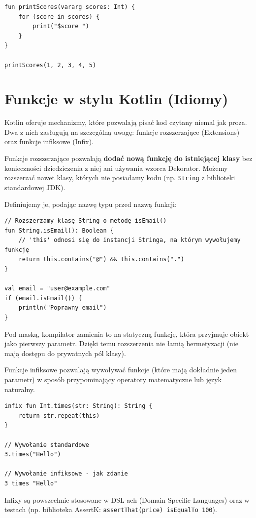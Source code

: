 \begin{verbatim}
fun printScores(vararg scores: Int) {
    for (score in scores) {
        print("$score ")
    }
}

printScores(1, 2, 3, 4, 5)
\end{verbatim}

\section{Funkcje w stylu Kotlin (Idiomy)}

Kotlin oferuje mechanizmy, które pozwalają pisać kod czytany niemal jak proza. Dwa z nich zasługują na szczególną uwagę: funkcje rozszerzające (Extensions) oraz funkcje infiksowe (Infix).

Funkcje rozszerzające pozwalają \textbf{dodać nową funkcję do istniejącej klasy} bez konieczności dziedziczenia z niej ani używania wzorca Dekorator. Możemy rozszerzać nawet klasy, których nie posiadamy kodu (np. \texttt{String} z biblioteki standardowej JDK).

Definiujemy je, podając nazwę typu przed nazwą funkcji:
\begin{verbatim}
// Rozszerzamy klasę String o metodę isEmail()
fun String.isEmail(): Boolean {
    // 'this' odnosi się do instancji Stringa, na którym wywołujemy funkcję
    return this.contains("@") && this.contains(".")
}

val email = "user@example.com"
if (email.isEmail()) { 
    println("Poprawny email")
}
\end{verbatim}

Pod maską, kompilator zamienia to na statyczną funkcję, która przyjmuje obiekt jako pierwszy parametr. Dzięki temu rozszerzenia nie łamią hermetyzacji (nie mają dostępu do prywatnych pól klasy).

Funkcje infiksowe pozwalają wywoływać funkcje (które mają dokładnie jeden parametr) w sposób przypominający operatory matematyczne lub język naturalny.

\begin{verbatim}
infix fun Int.times(str: String): String {
    return str.repeat(this)
}

// Wywołanie standardowe
3.times("Hello") 

// Wywołanie infiksowe - jak zdanie
3 times "Hello"
\end{verbatim}

Infixy są powszechnie stosowane w DSL-ach (Domain Specific Languages) oraz w testach (np. biblioteka AssertK: \texttt{assertThat(price) isEqualTo 100}).

